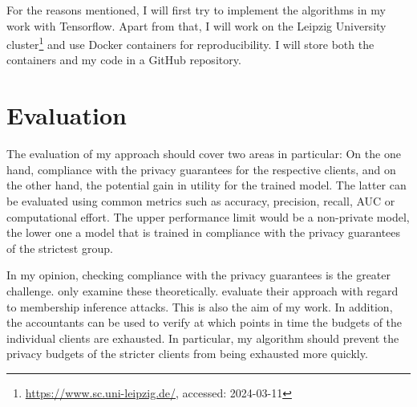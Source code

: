 For the reasons mentioned, I will first try to implement the algorithms in my work with Tensorflow. Apart from that, I will work on the Leipzig University cluster\footnote{\url{https://www.sc.uni-leipzig.de/}, accessed: 2024-03-11} and use Docker containers for reproducibility. I will store both the containers and my code in a GitHub repository.

\section{Evaluation}
The evaluation of my approach should cover two areas in particular: On the one hand, compliance with the privacy guarantees for the respective clients, and on the other hand, the potential gain in utility for the trained model. The latter can be evaluated using common metrics such as accuracy, precision, recall, AUC or computational effort. The upper performance limit would be a non-private model, the lower one a model that is trained in compliance with the privacy guarantees of the strictest group.

In my opinion, checking compliance with the privacy guarantees is the greater challenge. \textcite{aldaghri:2023} only examine these theoretically. \textcite{boenisch:2023} evaluate their approach with regard to membership inference attacks. This is also the aim of my work. In addition, the accountants can be used to verify at which points in time the budgets of the individual clients are exhausted. In particular, my algorithm should prevent the privacy budgets of the stricter clients from being exhausted more quickly.

